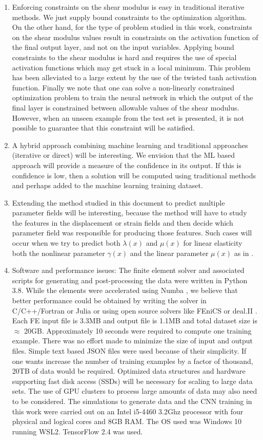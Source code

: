 \documentclass[12pt]{article}
\begin{document}
\begin{enumerate}
\item{Enforcing constraints on the shear modulus is easy in traditional iterative methods. We just supply bound constraints to the optimization algorithm. On the other hand, for the type of problem studied in this work, constraints on the shear modulus values result in constraints on the activation function of the final output layer, and not on the input variables. Applying bound constraints to the shear modulus is hard and requires the use of special activation functions which may get stuck in a local minimum. This problem has been alleviated to a large extent by the use of the twisted tanh activation function. Finally we note that one can solve a non-linearly constrained optimization problem to train the neural network in which the output of the final layer is constrained between allowable values of the shear modulus. However, when an unseen example from the test set is presented, it is not possible to guarantee that this constraint will be satisfied.}
\item{A hybrid approach combining machine learning and traditional approaches (iterative or direct) will be interesting. We envision that the ML based approach will provide a measure of the confidence in its output. If this is confidence is low, then a solution will be computed using traditional methods and perhaps added to the machine learning training dataset.}
\item{Extending the method studied in this document to predict multiple parameter fields will be interesting, because the method will have to study the features in the displacement or strain fields and then decide which parameter field was responsible for producing those features. Such cases will occur when we try to predict both $\lambda(x)$ and $\mu(x)$ for linear elasticity both the nonlinear parameter $\gamma(x)$ and the linear parameter $\mu(x)$ as in \cite{paper:gokhale2008}}.
\item{Software and performance issues: The finite element solver and associated scripts for generating and post-processing the data were written in Python 3.8. While the elements were accelerated using Numba \cite{conf:numba}, we believe that better performance could be obtained by writing the solver in C/C++/Fortran or Julia or using open source solvers like FEniCS \cite{paper:fenics} or deal.II \cite{paper:deal.ii}. Each FE input file is 3.3MB and output file is 1.1MB and total dataset size is $\approx$  20GB. Approximately 10 seconds were required to compute one training example. There was no effort made to minimize the size of input and output files. Simple text based JSON files were used because of their simplicity. If one wants increase the number of training examples by a factor of thousand, 20TB of data would be required. Optimized data structures and hardware supporting fast disk access (SSDs) will be necessary for scaling to large data sets. The use of GPU clusters to process large amounts of data may also need to be considered. The simulations to generate data and the CNN training in this work were carried out on an Intel i5-4460 3.2Ghz processor with four physical and logical cores and 8GB RAM. The OS used was Windows 10 running WSL2. TensorFlow 2.4 was used.}
\end{enumerate}
\end{document}
